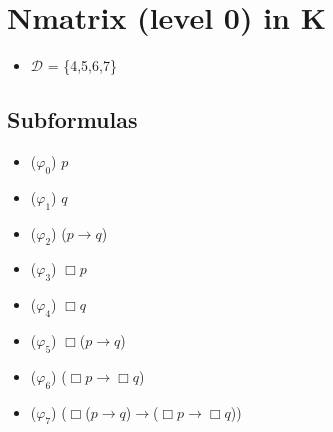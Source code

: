 \documentclass[
  14pt,
]{extarticle}
\author{}
\date{}
\providecommand{\tightlist}{%
  \setlength{\itemsep}{0pt}\setlength{\parskip}{0pt}}
\begin{document}
\hypertarget{nmatrix-level-0-in-k}{%
\section{Nmatrix (level 0) in K}\label{nmatrix-level-0-in-k}}

\begin{itemize}
\tightlist
\item
  \(\mathcal{D}\) = \{4,5,6,7\}
\end{itemize}

\hypertarget{subformulas}{%
\subsection{Subformulas}\label{subformulas}}

\begin{itemize}
\tightlist
\item
  (\(\varphi_{0}\)) \(p\)
\item
  (\(\varphi_{1}\)) \(q\)
\item
  (\(\varphi_{2}\)) (\(p\)\(\to\)\(q\))
\item
  (\(\varphi_{3}\)) \(\Box\)\(p\)
\item
  (\(\varphi_{4}\)) \(\Box\)\(q\)
\item
  (\(\varphi_{5}\)) \(\Box\)(\(p\)\(\to\)\(q\))
\item
  (\(\varphi_{6}\)) (\(\Box\)\(p\)\(\to\)\(\Box\)\(q\))
\item
  (\(\varphi_{7}\))
  (\(\Box\)(\(p\)\(\to\)\(q\))\(\to\)(\(\Box\)\(p\)\(\to\)\(\Box\)\(q\)))
\end{itemize}
\end{document}
